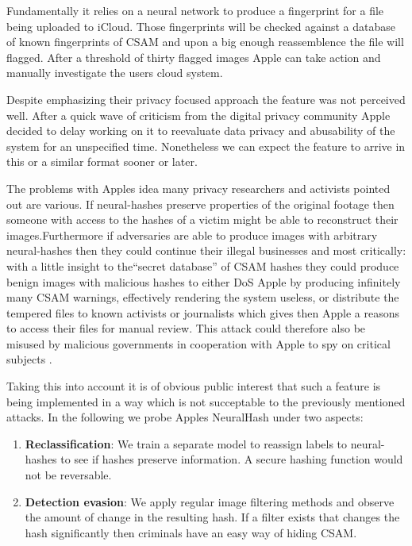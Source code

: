 \documentclass[10pt,twocolumn,letterpaper]{article}
\newcommand{\rref}[1]{\hyperref[ref:#1]{\text{[#1]}}}
\begin{document}
Fundamentally it relies on a neural network to produce a fingerprint for a file being uploaded to iCloud. Those fingerprints will be checked against a database of known fingerprints of CSAM and upon a big enough reassemblence the file will flagged. After a threshold of thirty flagged images Apple can take action and manually investigate the users cloud system.

Despite emphasizing their privacy focused approach the feature was not perceived well. After a quick wave of criticism from the digital privacy community \rref{5} Apple decided to delay working on it to reevaluate data privacy and abusability of the system for an unspecified time. Nonetheless we can expect the feature to arrive in this or a similar format sooner or later. 

The problems with Apples idea many privacy researchers and activists pointed out are various. If neural-hashes preserve properties of the original footage then someone with access to the hashes of a victim might be able to reconstruct their images.Furthermore if adversaries are able to produce images with arbitrary neural-hashes then they could continue their illegal businesses and most critically: with a little insight to the``secret database'' of CSAM hashes they could produce benign images with malicious hashes to either DoS Apple by producing infinitely many CSAM warnings, effectively rendering the system useless, or distribute the tempered files to known activists or journalists which gives then Apple a reasons to access their files for manual review. This attack could therefore also be misused by malicious governments in cooperation with Apple to spy on critical subjects \rref{6}.

Taking this into account it is of obvious public interest that such a feature is being implemented in a way which is not succeptable to the previously mentioned attacks. In the following we probe Apples NeuralHash under two aspects:

\begin{enumerate}

\item \textbf{Reclassification}: We train a separate model to reassign labels to neural-hashes to see if hashes preserve information. A secure hashing function would not be reversable.

\item \textbf{Detection evasion}: We apply regular image filtering methods and observe the amount of change in the resulting hash. If a filter exists that changes the hash significantly then criminals have an easy way of hiding CSAM.

\end{enumerate}
\end{document}
